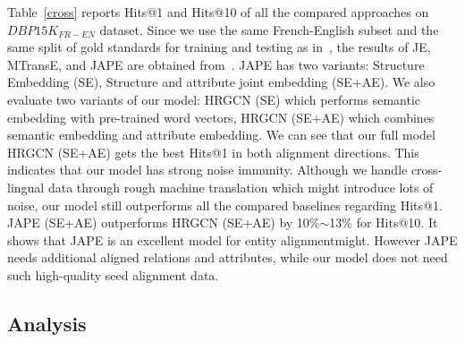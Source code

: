 	Table~\ref{cross} reports Hits@1 and Hits@10 of all the compared approaches on $DBP15K_{FR-EN}$ dataset. Since we use the same French-English subset and the same split of gold standards for training and testing as in~\cite{sun2017cross}, the results of JE, MTransE, and JAPE are obtained from~\cite{sun2017cross}. JAPE has two variants: Structure Embedding (SE), Structure and attribute joint embedding (SE+AE). We also evaluate two variants of our model: HRGCN (SE) which performs semantic embedding with pre-trained word vectors, HRGCN (SE+AE) which combines semantic embedding and attribute embedding. We can see that our full model HRGCN (SE+AE) gets the best Hits@1 in both alignment directions. This indicates that our model has strong noise immunity. Although we handle cross-lingual data through rough machine translation which might introduce lots of noise, our model still outperforms all the compared baselines regarding Hits@1. JAPE (SE+AE) outperforms HRGCN (SE+AE) by 10\%$\sim$13\% for Hits@10. It shows that JAPE is an
	excellent model for entity alignmentmight. However JAPE needs additional aligned relations and attributes, while our model does not need such high-quality seed alignment data.
	
	
	
	\subsection{Analysis}
	

